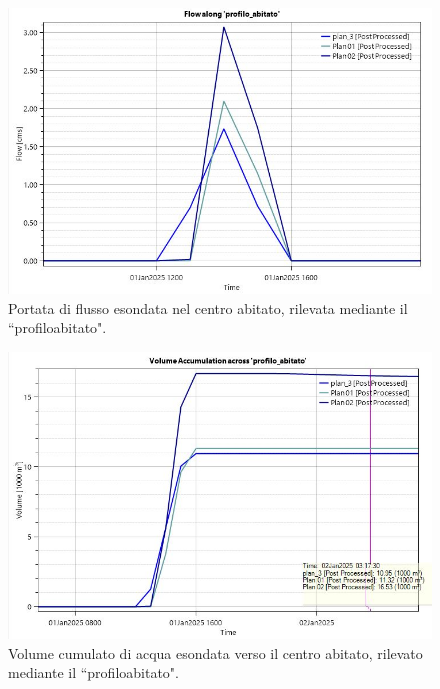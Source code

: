 \begin{figure}[H] \centering
    \includegraphics[scale=0.5]{immagini/flow_centro_abitato.JPG}
    \caption{Portata di flusso esondata nel centro abitato, rilevata mediante il ``profilo\textunderscore abitato".}
    \label{figure:flow_centro_abitato}
\end{figure}

\begin{figure}[H] \centering
    \includegraphics[scale=0.5]{immagini/volume_accumulation_centro_abitato.JPG}
    \caption{Volume cumulato di acqua esondata verso il centro abitato, rilevato mediante il ``profilo\textunderscore abitato".}
    \label{figure:volume_accumulation_centro_abitato}
\end{figure}

